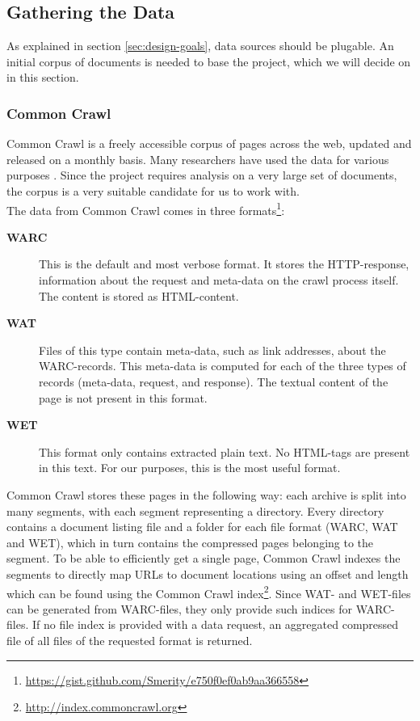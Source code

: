 \subsection{Gathering the Data}
As explained in section \ref{sec:design-goals}, data sources should be plugable. An initial corpus of documents is needed to base the project, which we will decide on in this section. 

\subsubsection{Common Crawl} \label{sec:commoncrawl}
Common Crawl \cite{commoncrawl} is a freely accessible corpus of pages across the web, updated and released on a monthly basis. Many researchers have used the data for various purposes
\cite{smith2013dirt, muhleisen2012web, singh2012wikilinks}.
Since the project requires analysis on a very large set of documents, the corpus is a very suitable candidate for us to work with. \\

The data from Common Crawl comes in three formats\footnote{\url{https://gist.github.com/Smerity/e750f0ef0ab9aa366558}}: 
\begin{description}
\item[\textbf{WARC}] This is the default and most verbose format. It stores the HTTP-response, information about the request and meta-data on the crawl process itself. The content is stored as HTML-content.
\item[\textbf{WAT}] Files of this type contain meta-data, such as link addresses, about the WARC-records. This meta-data is computed for each of the three types of records (meta-data, request, and response). The textual content of the page is not present in this format.
\item[\textbf{WET}] This format only contains extracted plain text. No HTML-tags are present in this text. For our purposes, this is the most useful format.
\end{description}

Common Crawl stores these pages in the following way: each archive is split into many segments, with each segment representing a directory. Every directory contains a document listing file and a folder for each file format (WARC, WAT and WET), which in turn contains the compressed pages belonging to the segment. To be able to efficiently get a single page, Common Crawl indexes the segments to directly map URLs to document locations using an offset and length which can be found using the Common Crawl index\footnote{\url{http://index.commoncrawl.org}}. Since WAT- and WET-files can be generated from WARC-files, they only provide such indices for WARC-files. If no file index is provided with a data request, an aggregated compressed file of all files of the requested format is returned.

